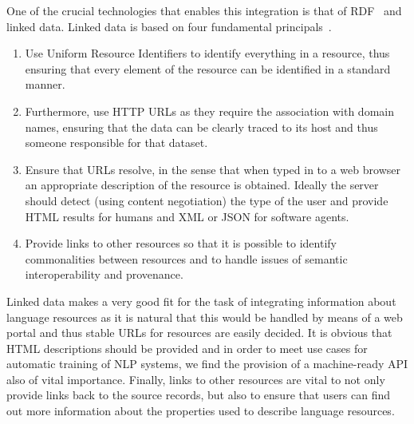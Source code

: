 \documentclass[smallextended]{svjour3}       %
\begin{document}
One of the crucial technologies that enables this integration is that of
RDF~\cite{klyne2006resource} and linked data. Linked data is based on four fundamental
principals~\cite{bizer2009linked}.

\begin{enumerate}
    \item Use Uniform Resource Identifiers to identify everything in a resource,
        thus ensuring that every element of the resource can be identified in a
        standard manner.
    \item Furthermore, use HTTP URLs as they require the association with domain
        names, ensuring that the data can
        be clearly traced to its host and thus someone responsible for that
        dataset.
    \item Ensure that URLs resolve, in the sense that when typed in to a web
        browser an appropriate description of the resource is obtained. Ideally
        the server should detect (using content negotiation) the type of the
        user and provide HTML results for humans and XML or JSON for software
        agents.
    \item Provide links to other resources so that it is possible to identify
        commonalities between resources and to handle issues of semantic
        interoperability and provenance.
\end{enumerate}

Linked data makes a very good fit for the task of integrating information about
language resources as it is natural that this would be handled by means of a web
portal and thus stable URLs for resources are easily decided. It is obvious that
HTML descriptions should be provided and in order to meet use cases for
automatic training of NLP systems, we find the provision of a machine-ready API
also of vital importance. Finally, links to other resources are vital to not
only provide links back to the source records, but also to ensure that users can
find out more information about the properties used to describe language resources.
\end{document}
